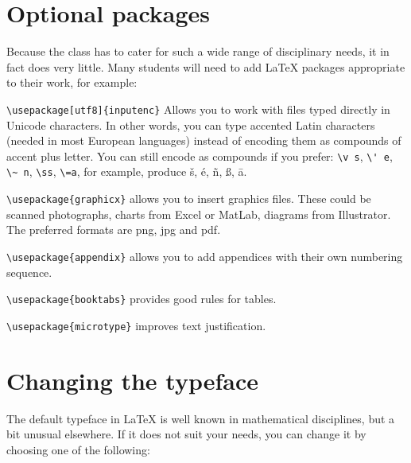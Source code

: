 \section{Optional packages}
Because the class has to cater for such a wide range of disciplinary needs, it in fact does very little. Many students will need to add LaTeX packages appropriate to their work, for example:

\begin{description}
\item {\verb+\usepackage[utf8]{inputenc}+} Allows you to work with files typed directly in Unicode characters. In other words, you can type accented Latin characters (needed in most European languages) instead of encoding them as compounds of accent plus letter. You can still encode as compounds if you prefer: \verb+\v s+, \verb+\' e+, \verb+\~ n+, \verb+\ss+, \verb+\=a+, for example, produce \v s, \'e, \~n, \ss, \=a.

\item {\verb+\usepackage{graphicx}+} allows you to insert graphics files. These could be scanned photographs, charts from Excel or MatLab, diagrams from Illustrator. The preferred formats are png, jpg and pdf. 

\item {\verb+\usepackage{appendix}+} allows you to add appendices with their own numbering sequence.

\item {\verb+\usepackage{booktabs}+} provides good rules for tables.

\item {\verb+\usepackage{microtype}+} improves text justification.

\end{description}

\section{Changing the typeface}

The default typeface in LaTeX is well known in mathematical disciplines, but a bit unusual elsewhere. If it does not suit your needs, you can change it by choosing one of the following:

